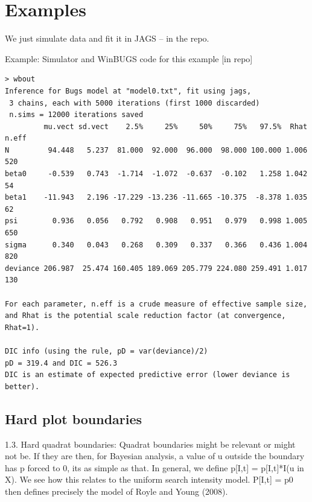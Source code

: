 \section{Examples}

We just simulate data and fit it in JAGS -- in the repo.

Example: Simulator and WinBUGS code for this example [in repo]


\begin{verbatim}
> wbout
Inference for Bugs model at "model0.txt", fit using jags,
 3 chains, each with 5000 iterations (first 1000 discarded)
 n.sims = 12000 iterations saved
         mu.vect sd.vect    2.5%     25%     50%     75%   97.5%  Rhat n.eff
N         94.448   5.237  81.000  92.000  96.000  98.000 100.000 1.006   520
beta0     -0.539   0.743  -1.714  -1.072  -0.637  -0.102   1.258 1.042    54
beta1    -11.943   2.196 -17.229 -13.236 -11.665 -10.375  -8.378 1.035    62
psi        0.936   0.056   0.792   0.908   0.951   0.979   0.998 1.005   650
sigma      0.340   0.043   0.268   0.309   0.337   0.366   0.436 1.004   820
deviance 206.987  25.474 160.405 189.069 205.779 224.080 259.491 1.017   130

For each parameter, n.eff is a crude measure of effective sample size,
and Rhat is the potential scale reduction factor (at convergence, Rhat=1).

DIC info (using the rule, pD = var(deviance)/2)
pD = 319.4 and DIC = 526.3
DIC is an estimate of expected predictive error (lower deviance is better).
\end{verbatim}




\subsection{Hard plot boundaries}

1.3. Hard quadrat boundaries: Quadrat boundaries might be relevant or might not be.  If they are then, for Bayesian analysis, a value of u outside the boundary has p forced to 0, its as simple as that. 
In general, we define p[I,t] = p[I,t]*I(u in X).
We see how this relates to the uniform search intensity model.  P[I,t] = p0 then defines precisely the model of Royle and Young (2008). 


